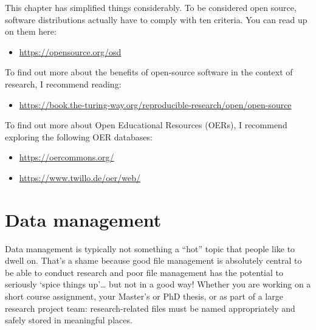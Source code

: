 \documentclass[
  letterpaper,
  DIV=11,
  numbers=noendperiod]{scrreprt}
\providecommand{\tightlist}{%
  \setlength{\itemsep}{0pt}\setlength{\parskip}{0pt}}\usepackage{longtable,booktabs,array}
\begin{document}
\begin{tcolorbox}[enhanced jigsaw, colback=white, colframe=quarto-callout-note-color-frame, coltitle=black, toprule=.15mm, bottomtitle=1mm, arc=.35mm, left=2mm, opacityback=0, leftrule=.75mm, toptitle=1mm, titlerule=0mm, title=\textcolor{quarto-callout-note-color}{\faInfo}\hspace{0.5em}{Tips to go further}, opacitybacktitle=0.6, bottomrule=.15mm, colbacktitle=quarto-callout-note-color!10!white, rightrule=.15mm, breakable]

This chapter has simplified things considerably. To be considered open
source, software distributions actually have to comply with ten
criteria. You can read up on them here:

\begin{itemize}
\tightlist
\item
  \url{https://opensource.org/osd}
\end{itemize}

To find out more about the benefits of open-source software in the
context of research, I recommend reading:

\begin{itemize}
\tightlist
\item
  \url{https://book.the-turing-way.org/reproducible-research/open/open-source}
\end{itemize}

To find out more about Open Educational Resources (OERs), I recommend
exploring the following OER databases:

\begin{itemize}
\tightlist
\item
  \url{https://oercommons.org/}
\item
  \url{https://www.twillo.de/oer/web/}
\end{itemize}

\end{tcolorbox}


\chapter{Data management}\label{data-management}

Data management is typically not something a ``hot'' topic that people
like to dwell on. That's a shame because good file management is
absolutely central to be able to conduct research and poor file
management has the potential to seriously `spice things up'\ldots{} but
not in a good way! Whether you are working on a short course assignment,
your Master's or PhD thesis, or as part of a large research project
team: research-related files must be named appropriately and safely
stored in meaningful places.
\end{document}
